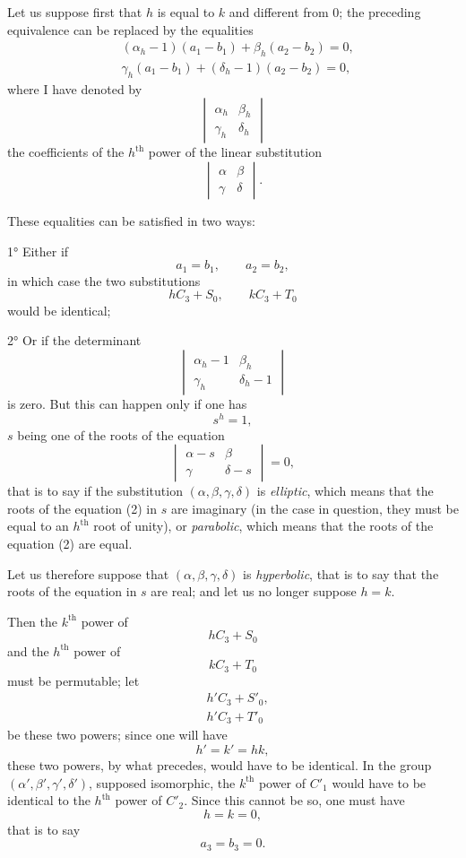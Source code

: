 \documentclass{article}
\begin{document}
Let us suppose first that $h$ is equal to $k$ and different from 0; the preceding equivalence can be replaced by the equalities
\[ \begin{aligned} &(\alpha_{h} - 1)(a_{1} - b_{1}) + \beta_{h}(a_{2} - b_{2}) = 0,\\ &\gamma_{h}(a_{1} - b_{1}) + (\delta_{h} - 1)(a_{2} - b_{2}) = 0, \end{aligned} \]
where I have denoted by
\[ \begin{vmatrix} \alpha_{h} & \beta_{h} \\[1ex] \gamma_{h} & \delta_{h} \end{vmatrix} \]
the coefficients of the $h^{\text{th}}$ power of the linear substitution
\[ \begin{vmatrix} \alpha & \beta \\[1ex] \gamma & \delta \end{vmatrix}. \]

These equalities can be satisfied in two ways:

1° Either if
\[ a_{1} = b_{1}, \qquad a_{2} = b_{2}, \]
in which case the two substitutions
\[ hC_{3} + S_{0}, \qquad kC_{3} + T_{0} \]
would be identical;

2° Or if the determinant
\[ \begin{vmatrix} \alpha_{h} - 1 & \beta_{h} \\[1ex] \gamma_{h} & \delta_{h} - 1 \end{vmatrix} \]
is zero. But this can happen only if one has
\[ s^{h} = 1, \]
$s$ being one of the roots of the equation
\[ \begin{vmatrix} \alpha - s & \beta \\[1ex] \gamma & \delta - s \end{vmatrix} = 0, \tag{2} \]
that is to say if the substitution $(\alpha, \beta, \gamma, \delta)$ is \emph{elliptic}, which means that the roots of the equation (2) in $s$ are imaginary (in the case in question, they must be equal to an $h^{\text{th}}$ root of unity), or \emph{parabolic}, which means that the roots of the equation (2) are equal.

Let us therefore suppose that $(\alpha, \beta, \gamma, \delta)$ is \emph{hyperbolic}, that is to say that the roots of the equation in $s$ are real; and let us no longer suppose $h = k$.

Then the $k^{\text{th}}$ power of
\[ hC_{3} + S_{0} \]
and the $h^{\text{th}}$ power of
\[ kC_{3} + T_{0} \]
must be permutable; let
\[ \begin{aligned} &h'C_{3} + S'_{0},\\ &h'C_{3} + T'_{0} \end{aligned} \]
be these two powers; since one will have
\[ h' = k' = hk, \]
these two powers, by what precedes, would have to be identical. In the group $(\alpha', \beta', \gamma', \delta')$, supposed isomorphic, the $k^{\text{th}}$ power of $C'_{1}$
would have to be identical to the $h^{\text{th}}$ power of $C'_{2}$. Since this cannot be so, one must have
\[ h = k = 0, \]
that is to say
\[ a_{3} = b_{3} = 0. \]
\end{document}
